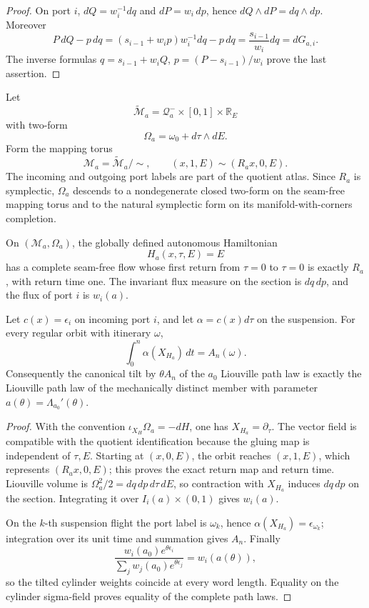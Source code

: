 \begin{proof}
On port \(i\), \(dQ=w_i^{-1}dq\) and \(dP=w_i\,dp\), hence
\(dQ\wedge dP=dq\wedge dp\).  Moreover
\[
 P\,dQ-p\,dq
 =\left(s_{i-1}+w_i p\right)w_i^{-1}dq-p\,dq
 =\frac{s_{i-1}}{w_i}dq=dG_{a,i}.
\]
The inverse formulas
\(q=s_{i-1}+w_iQ\), \(p=(P-s_{i-1})/w_i\) prove the last assertion.
\end{proof}

Let
\[
 \widetilde{\mathcal M}_a
 =\mathcal Q_a^-\times[0,1]\times\mathbb R_E
\]
with two-form
\[
 \Omega_a=\omega_0+d\tau\wedge dE.
\]
Form the mapping torus
\[
 \mathcal M_a=
 \widetilde{\mathcal M}_a/\!\sim,
 \qquad
 (x,1,E)\sim(R_ax,0,E).
\]
The incoming and outgoing port labels are part of the quotient atlas.  Since
\(R_a\) is symplectic, \(\Omega_a\) descends to a nondegenerate closed
two-form on the seam-free mapping torus and to the natural symplectic form on
its manifold-with-corners completion.

\begin{theorem}
\label{thm:r4-a1-suspension}
On \((\mathcal M_a,\Omega_a)\), the globally defined autonomous Hamiltonian
\[
 H_a(x,\tau,E)=E
\]
has a complete seam-free flow whose first return from \(\tau=0\) to
\(\tau=0\) is exactly \(R_a\), with return time one.  The invariant flux
measure on the section is \(dq\,dp\), and the flux of port \(i\) is
\(w_i(a)\).

Let \(c(x)=\epsilon_i\) on incoming port \(i\), and let
\(\alpha=c(x)d\tau\) on the suspension.  For every regular orbit with
itinerary \(\omega\),
\[
 \int_0^n\alpha(X_{H_a})\,dt=A_n(\omega).
\]
Consequently the canonical tilt by \(\theta A_n\) of the \(a_0\) Liouville
path law is exactly the Liouville path law of the mechanically distinct
member with parameter \(a(\theta)=\Lambda_{a_0}'(\theta)\).
\end{theorem}

\begin{proof}
With the convention
\(\iota_{X_H}\Omega_a=-dH\), one has \(X_{H_a}=\partial_\tau\).  The vector
field is compatible with the quotient identification because the gluing map
is independent of \(\tau,E\).  Starting at \((x,0,E)\), the orbit reaches
\((x,1,E)\), which represents \((R_ax,0,E)\); this proves the exact return
map and return time.  Liouville volume is
\(\Omega_a^2/2=dq\,dp\,d\tau\,dE\), so contraction with
\(X_{H_a}\) induces \(dq\,dp\) on the section.  Integrating it over
\(I_i(a)\times(0,1)\) gives \(w_i(a)\).

On the \(k\)-th suspension flight the port label is \(\omega_k\), hence
\(\alpha(X_{H_a})=\epsilon_{\omega_k}\); integration over its unit time and
summation gives \(A_n\).  Finally
\[
 \frac{w_i(a_0)e^{\theta\epsilon_i}}
 {\sum_jw_j(a_0)e^{\theta\epsilon_j}}
 =w_i(a(\theta)),
\]
so the tilted cylinder weights coincide at every word length.  Equality on
the cylinder sigma-field proves equality of the complete path laws.
\end{proof}

